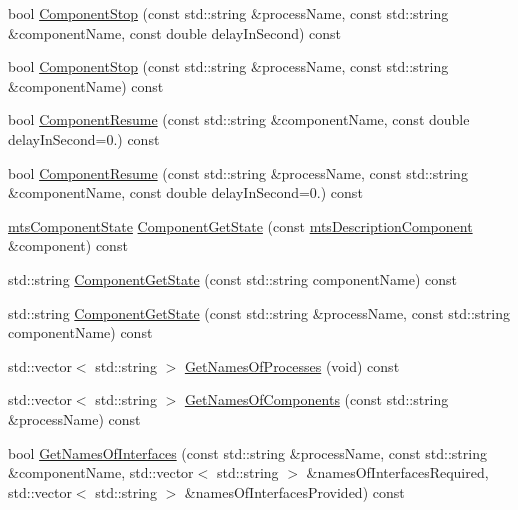 \begin{DoxyCompactItemize}
\item 
bool \hyperlink{classmts_manager_component_services_a85c5932959c5749a94f2c5ddcd827955}{Component\+Stop} (const std\+::string \&process\+Name, const std\+::string \&component\+Name, const double delay\+In\+Second) const 
\item 
bool \hyperlink{classmts_manager_component_services_ad812caeaf90184905e3018dd9a179656}{Component\+Stop} (const std\+::string \&process\+Name, const std\+::string \&component\+Name) const 
\item 
bool \hyperlink{classmts_manager_component_services_a1a7c9681b7c4cca3eac66609e25ecf02}{Component\+Resume} (const std\+::string \&component\+Name, const double delay\+In\+Second=0.) const 
\item 
bool \hyperlink{classmts_manager_component_services_a06266b2614a2607b2e1f645c0f26de17}{Component\+Resume} (const std\+::string \&process\+Name, const std\+::string \&component\+Name, const double delay\+In\+Second=0.) const 
\item 
\hyperlink{classmts_component_state}{mts\+Component\+State} \hyperlink{classmts_manager_component_services_a45db338b5d8dca05cbfaa23494f4719d}{Component\+Get\+State} (const \hyperlink{classmts_description_component}{mts\+Description\+Component} \&component) const 
\item 
std\+::string \hyperlink{classmts_manager_component_services_ad46de601398935707428ad4f4d5438b8}{Component\+Get\+State} (const std\+::string component\+Name) const 
\item 
std\+::string \hyperlink{classmts_manager_component_services_abfd5fbf1f42ddd2278acdedbf77303f9}{Component\+Get\+State} (const std\+::string \&process\+Name, const std\+::string component\+Name) const 
\item 
std\+::vector$<$ std\+::string $>$ \hyperlink{classmts_manager_component_services_af961f84fde69fcaf76f1d070e9c5d712}{Get\+Names\+Of\+Processes} (void) const 
\item 
std\+::vector$<$ std\+::string $>$ \hyperlink{classmts_manager_component_services_af3aee169d9fc69f0807784371bbf488f}{Get\+Names\+Of\+Components} (const std\+::string \&process\+Name) const 
\item 
bool \hyperlink{classmts_manager_component_services_a51b7abf298cced848c5f967e6dc25f81}{Get\+Names\+Of\+Interfaces} (const std\+::string \&process\+Name, const std\+::string \&component\+Name, std\+::vector$<$ std\+::string $>$ \&names\+Of\+Interfaces\+Required, std\+::vector$<$ std\+::string $>$ \&names\+Of\+Interfaces\+Provided) const 

\end{DoxyCompactItemize}
